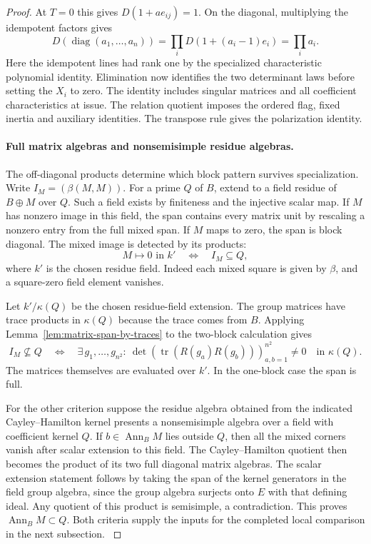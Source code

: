\begin{proof}
At
\(T=0\) this gives \(D(1+a e_{ij})=1\).
On the diagonal, multiplying the idempotent factors gives
\[
  D(\operatorname{diag}(a_1,\dots,a_n))
    =\prod_i D(1+(a_i-1)e_i)=\prod_i a_i .
\]
Here the idempotent lines had rank one by the specialized
characteristic polynomial identity. Elimination now identifies
the two determinant laws before setting the \(X_i\) to zero.
The identity includes singular matrices and all coefficient
characteristics at issue.  The relation quotient imposes the ordered flag, fixed inertia and auxiliary identities. The transpose rule gives the polarization identity.
\label{cor:ordinary-patching-matrices-7}

\paragraph{Full matrix algebras and nonsemisimple residue algebras.}
The off-diagonal products determine which block pattern survives specialization. Write
\(I_M=(\beta(M,M))\). For a prime \(Q\) of \(B\),
extend to a field residue of \(B\oplus M\) over \(Q\).
Such a field exists by finiteness and the injective scalar
map. If \(M\) has nonzero image in this field, the span
contains every matrix unit by rescaling a nonzero entry
from the full mixed span. If \(M\) maps to zero, the span
is block diagonal. The mixed image is detected by its products: 
\[
 M\longmapsto0\text{ in }k'\quad\Longleftrightarrow\quad I_M\subseteq Q,
\]
 where \(k'\) is the chosen residue field. Indeed each mixed square is given by \(\beta\), and a square-zero field element vanishes.

Let \(k'/\kappa(Q)\) be the chosen residue-field extension. The group matrices have trace products in \(\kappa(Q)\) because the trace comes from \(B\). Applying Lemma~\ref{lem:matrix-span-by-traces} to the two-block calculation gives
\[
 I_M\not\subseteq Q
 \quad\Longleftrightarrow\quad
 \exists\,g_1,\ldots,g_{n^2}:\ 
 \det\!\left(\operatorname{tr}(R(g_a)R(g_b))\right)_{a,b=1}^{n^2}\ne0
 \quad\text{in }\kappa(Q).
\]
The matrices themselves are evaluated over \(k'\).
 In the one-block case the span is full.

For the other criterion suppose the residue algebra obtained
from the indicated Cayley--Hamilton kernel presents a
nonsemisimple algebra over a field with coefficient kernel
\(Q\). If \(b\in\operatorname{Ann}_B M\) lies outside \(Q\),
then all the mixed corners vanish after scalar extension
to this field. The Cayley--Hamilton quotient then becomes
the product of its two full diagonal matrix algebras.
The scalar extension statement follows by taking the span
of the kernel generators in the field group algebra, since
the group algebra surjects onto \(E\) with that defining
ideal. Any quotient of this product is semisimple, a
contradiction. This proves \(\operatorname{Ann}_B M\subset Q\). Both criteria supply the inputs for the
completed local comparison in the next subsection.
\label{cor:ordinary-patching-matrices-8}
\end{proof}

